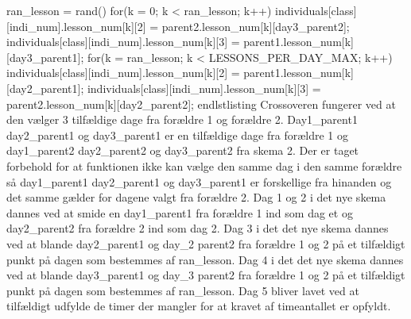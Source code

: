   ran_lesson = rand()%
  for(k = 0; k < ran_lesson; k++){   
    individuals[class][indi_num].lesson_num[k][2] = parent2.lesson_num[k][day3_parent2];
    individuals[class][indi_num].lesson_num[k][3] = parent1.lesson_num[k][day3_parent1];
  }
  for(k = ran_lesson; k < LESSONS_PER_DAY_MAX; k++){   
    individuals[class][indi_num].lesson_num[k][2] = parent1.lesson_num[k][day2_parent1];
    individuals[class][indi_num].lesson_num[k][3] = parent2.lesson_num[k][day2_parent2];
  }
 end{lstlisting}
Crossoveren fungerer ved at den vælger 3 tilfældige dage fra forældre 1 og forældre 2. Day1\_parent1 day2\_parent1 og day3\_parent1 er en tilfældige dage fra forældre 1 og day1\_parent2 day2\_parent2 og day3\_parent2 fra skema 2. Der er taget forbehold for at funktionen ikke kan vælge den samme dag i den samme forældre så day1\_parent1 day2\_parent1 og day3\_parent1 er forskellige fra hinanden og det samme gælder for dagene valgt fra forældre 2. 
Dag 1 og 2 i det nye skema dannes ved at smide en day1\_parent1 fra forældre 1 ind som dag et og day2\_parent2 fra forældre 2 ind som dag 2.
Dag 3 i det det nye skema dannes ved at blande day2\_parent1 og day\_2 parent2 fra forældre 1 og 2 på et tilfældigt punkt på dagen som bestemmes af ran_lesson. Dag 4 i det det nye skema dannes ved at blande day3\_parent1 og day\_3 parent2 fra forældre 1 og 2 på et tilfældigt punkt på dagen som bestemmes af ran_lesson. 
Dag 5 bliver lavet ved at tilfældigt udfylde de timer der mangler for at kravet af timeantallet er opfyldt.  

